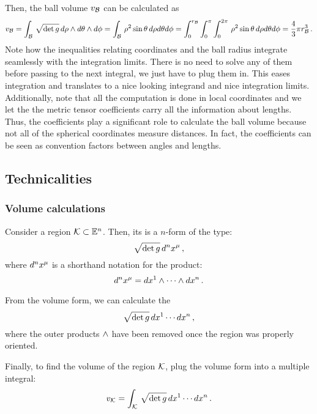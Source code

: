 Then, the ball volume $v_{\mathcal{B}}$ can be calculated as
%
\begin{equation*}
  v_{\mathcal{B}} = \int_{\mathcal{B}}\,\sqrt{\det g}\,d\rho\wedge d\theta\wedge d\phi
           = \int_{\mathcal{B}}\,\rho^2\sin\theta\,d\rho d\theta d\phi
           = \int_0^{r_{\mathcal{B}}} \int_0^{\pi} \int_0^{2\pi}\,\rho^2\sin\theta\,d\rho d\theta d\phi
           = \dfrac 43\pi r_{\mathcal{B}}^3 \,.
\end{equation*}
%
Note how the inequalities relating coordinates and the ball radius integrate seamlessly with the integration limits. There is no need to solve any of them before passing to the next integral, we just have to plug them in. This eases integration and translates to a nice looking integrand and nice integration limits. Additionally, note that all the computation is done in local coordinates and we let the the metric tensor coefficients carry all the information about lengths. Thus, the coefficients play a significant role to calculate the ball volume because not all of the spherical coordinates measure distances. In fact, the coefficients can be seen as convention factors between angles and lengths.


\subsection{Technicalities}
%
\subsubsection{Volume calculations}
%
Consider a region $\mathcal{K}\subset\mathbb{E}^{n}$. Then, its  is a $n$-form of the type:
%
\begin{equation*}
  \sqrt{\det\metric}\,d^n\tvec\pos\mu\,,
\end{equation*}
%
where $d^n\tvec\pos\mu$ is a shorthand notation for the product:
%
\begin{equation}
  d^n\tvec\pos\mu = d\tvec\pos 1\oprod\dotsb\oprod d\tvec\pos n\,.
\end{equation}

From the volume form, we can calculate the 
%
\begin{equation*}
  \sqrt{\det\metric}\,d\tvec\pos 1 \dotsb d\tvec\pos n\,,
\end{equation*}
%
where the outer products $\wedge$ have been removed once the region was properly oriented.

Finally, to find the volume of the region $\mathcal{K}$, plug the volume form into a multiple integral:
%
\begin{equation*}
  \volume_{\region K} = \int_{\region K}\,\sqrt{\det\metric}\,d\tvec\pos 1 \dotsb d\tvec\pos n\,.
\end{equation*}


